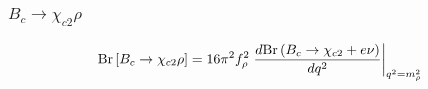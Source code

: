\documentclass{beamer}
\begin{document}
\begin{frame}[t]
\begin{columns}
\begin{column}{0.5\textwidth}
    \end{column}
  \end{columns}
\end{frame}


\begin{frame}
  \frametitle{$B_c \to \chi_{c2} \rho$}
  $$
  \mathrm{Br}\left[B_c \to \chi_{c2} \rho\right] =
  16\pi^2 f_\rho^2 \left.
    \frac{d\mathrm{Br}\left(B_c\to\chi_{c2}+e\nu\right)}{dq^2}
  \right|_{q^2=m_\rho^2}
  $$
  \begin{columns}
    \begin{column}{0.5\textwidth}
      \vspace{3mm}
      
    \end{column}
  \begin{column}{0.5\textwidth}
      \\
      \vspace{3mm}
      
    \end{column}
\end{columns}
\end{frame}
\end{document}
